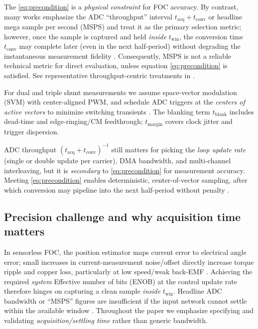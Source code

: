 \documentclass[conference]{IEEEtran}
\begin{document}
\medskip
The \eqref{eq:precondition} is a \emph{physical constraint} for FOC accuracy. By contrast, many works emphasize the ADC “throughput” interval \(t_{\mathrm{acq}}{+}t_{\mathrm{conv}}\) or headline mega sample per second (MSPS) and treat it as the primary selection metric; however, once the sample is captured and held \emph{inside} $t_{\mathrm{win}}$, the conversion time \(t_{\mathrm{conv}}\) may complete later (even in the next half-period) without degrading the instantaneous measurement fidelity \cite{Kester2005,Bose2002}. Consequently, MSPS is not a reliable technical metric for direct evaluation, unless equation \eqref{eq:precondition} is satisfied. See representative throughput-centric treatments in \cite{ADI_EE365_2013,NXP_AN4608_2012,MathWorks_MCB_Sampling_2025,TI_SLAAE96A_2023,ST_AN3116_2010,Microchip_AN1078_2010}.

\medskip
For dual and triple shunt measurements we assume space-vector modulation (SVM) with center-aligned PWM, and schedule ADC triggers at the \emph{centers of active vectors} to minimize switching transients \cite{VanDerBroeck1986,Bose2002}. The blanking term \(t_{\mathrm{blank}}\) includes dead-time and edge-ringing/CM feedthrough; \(t_{\mathrm{margin}}\) covers clock jitter and trigger dispersion.

\medskip
ADC throughput \((t_{\mathrm{acq}}{+}t_{\mathrm{conv}})^{-1}\) still matters for picking the \emph{loop update rate} (single or double update per carrier), DMA bandwidth, and multi-channel interleaving, but it is \emph{secondary} to \eqref{eq:precondition} for measurement accuracy. Meeting \eqref{eq:precondition} enables deterministic, center-of-vector sampling, after which conversion may pipeline into the next half-period without penalty \cite{wendler_analysis_2025,kofler_sensorless_2025}. 

\subsection{Precision challenge and why acquisition time matters}
In sensorless FOC, the position estimator maps current error to electrical angle error; small increases in current-measurement noise/offset directly increase torque ripple and copper loss, particularly at low speed/weak back-EMF \cite{wendler_mechanical_2024}. Achieving the required \emph{system} Effective number of bits (ENOB) at the control update rate therefore hinges on capturing a clean sample \emph{inside} $t_{\text{win}}$. Headline ADC bandwidth or “MSPS” figures are insufficient if the input network cannot settle within the available window \cite{wendler_enhancing_2025}. Throughout the paper we emphasize specifying and validating \emph{acquisition/settling time} rather than generic bandwidth.
\end{document}

